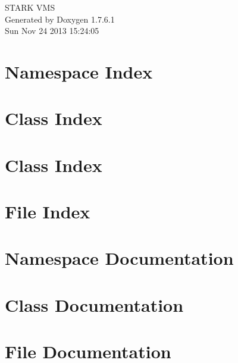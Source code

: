 \documentclass[a4paper]{book}
\begin{document}
\hypersetup{pageanchor=false,citecolor=blue}
\begin{titlepage}
\vspace*{7cm}
\begin{center}
{\Large \-S\-T\-A\-R\-K \-V\-M\-S }\\
\vspace*{1cm}
{\large \-Generated by Doxygen 1.7.6.1}\\
\vspace*{0.5cm}
{\small Sun Nov 24 2013 15:24:05}\\
\end{center}
\end{titlepage}
\clearemptydoublepage
{}
\tableofcontents
\clearemptydoublepage
{}
\hypersetup{pageanchor=true,citecolor=blue}
\chapter{\-Namespace \-Index}

\chapter{\-Class \-Index}

\chapter{\-Class \-Index}

\chapter{\-File \-Index}

\chapter{\-Namespace \-Documentation}





\chapter{\-Class \-Documentation}












\chapter{\-File \-Documentation}












\printindex
\end{document}
